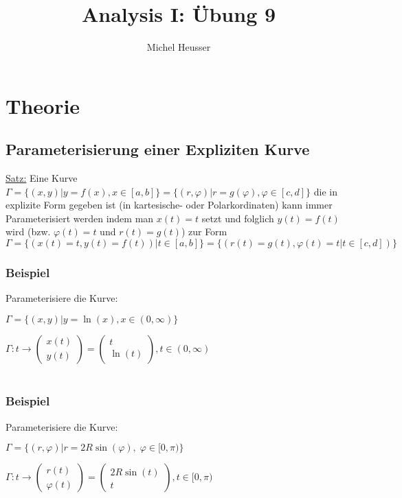 \documentclass[11pt]{article} %
\title{Analysis I: Übung 9}
\author{Michel Heusser}
\begin{document}
\maketitle

\section{Theorie}

\subsection{Parameterisierung einer Expliziten Kurve}


\underline{Satz:} Eine Kurve $\Gamma = \{(x,y) | y = f(x), x \in [a,b] \} = \{(r,\varphi) | r = g(\varphi), \varphi \in [c,d]\} $ die in explizite Form gegeben ist (in kartesische- oder Polarkordinaten) kann immer Parameterisiert werden indem man $x(t) = t$ setzt und folglich $y(t) = f(t)$ wird (bzw. $\varphi(t) = t$ und $r(t) = g(t)$) zur Form $\Gamma = \{(x(t)=t,y(t)=f(t)) |t \in [a,b] \} = \{(r(t)=g(t), \varphi(t) = t | t \in [c,d])\}$

\subsubsection{Beispiel}

Parameterisiere die Kurve:

$\Gamma = \{(x,y) | y = \ln(x), x\in (0,\infty)\}$

$\Gamma: t \rightarrow  \left(\!
    \begin{array}{c}
     x(t)   \\
     y(t) 
    \end{array}
  \!\right) = \left(\!
    \begin{array}{c}
     t   \\
     \ln(t) 
    \end{array}
  \!\right), t \in (0, \infty)$\\\\

\subsubsection{Beispiel}

Parameterisiere die Kurve:

$\Gamma = \{(r,\varphi) | r = 2R\sin(\varphi), \; \varphi \in [0,\pi)\}$

$\Gamma: t \rightarrow  \left(\!
    \begin{array}{c}
     r(t)   \\
     \varphi(t) 
    \end{array}
  \!\right) = \left(\!
    \begin{array}{c}
     2R\sin(t)   \\
     t 
    \end{array}
  \!\right), t \in [0, \pi)$\\\\
\end{document}
